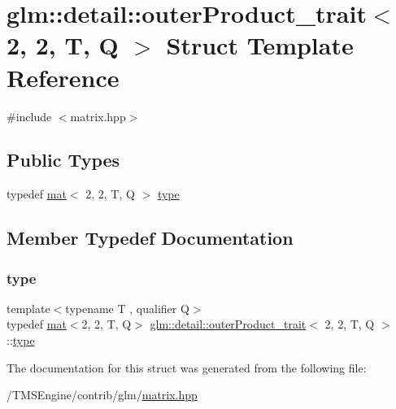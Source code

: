 \hypertarget{structglm_1_1detail_1_1outer_product__trait_3_012_00_012_00_01_t_00_01_q_01_4}{}\section{glm\+:\+:detail\+:\+:outer\+Product\+\_\+trait$<$ 2, 2, T, Q $>$ Struct Template Reference}
\label{structglm_1_1detail_1_1outer_product__trait_3_012_00_012_00_01_t_00_01_q_01_4}


{\ttfamily \#include $<$matrix.\+hpp$>$}

\subsection*{Public Types}
\begin{DoxyCompactItemize}
\item 
typedef \hyperlink{structglm_1_1mat}{mat}$<$ 2, 2, T, Q $>$ \hyperlink{structglm_1_1detail_1_1outer_product__trait_3_012_00_012_00_01_t_00_01_q_01_4_a28a25a20b2ff9729f6fb60728dc8a305}{type}
\end{DoxyCompactItemize}


\subsection{Member Typedef Documentation}
\mbox{\label{structglm_1_1detail_1_1outer_product__trait_3_012_00_012_00_01_t_00_01_q_01_4_a28a25a20b2ff9729f6fb60728dc8a305}} 
\subsubsection{\texorpdfstring{type}{type}}
{\footnotesize\ttfamily template$<$typename T , qualifier Q$>$ \\
typedef \hyperlink{structglm_1_1mat}{mat}$<$2, 2, T, Q$>$ \hyperlink{structglm_1_1detail_1_1outer_product__trait}{glm\+::detail\+::outer\+Product\+\_\+trait}$<$ 2, 2, T, Q $>$\+::\hyperlink{structglm_1_1detail_1_1outer_product__trait_3_012_00_012_00_01_t_00_01_q_01_4_a28a25a20b2ff9729f6fb60728dc8a305}{type}}



The documentation for this struct was generated from the following file\+:\begin{DoxyCompactItemize}
\item 
/\+T\+M\+S\+Engine/contrib/glm/\hyperlink{matrix_8hpp}{matrix.\+hpp}\end{DoxyCompactItemize}
